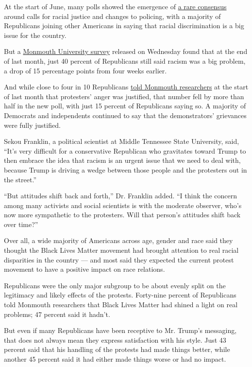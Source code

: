 At the start of June, many polls showed the emergence of
\href{https://www.nytimes.com/2020/06/05/us/politics/polling-george-floyd-protests-racism.html}{a
rare consensus} around calls for racial justice and changes to policing,
with a majority of Republicans joining other Americans in saying that
racial discrimination is a big issue for the country.

But a
\href{https://www.monmouth.edu/polling-institute/documents/monmouthpoll_us_070820.pdf/}{Monmouth
University survey} released on Wednesday found that at the end of last
month, just 40 percent of Republicans still said racism was a big
problem, a drop of 15 percentage points from four weeks earlier.

And while close to four in 10 Republicans
\href{https://www.monmouth.edu/polling-institute/documents/monmouthpoll_us_060220.pdf/}{told
Monmouth researchers} at the start of last month that protesters' anger
was justified, that number fell by more than half in the new poll, with
just 15 percent of Republicans saying so. A majority of Democrats and
independents continued to say that the demonstrators' grievances were
fully justified.

Sekou Franklin, a political scientist at Middle Tennessee State
University, said, ``It's very difficult for a conservative Republican
who gravitates toward Trump to then embrace the idea that racism is an
urgent issue that we need to deal with, because Trump is driving a wedge
between those people and the protesters out in the street.''

``But attitudes shift back and forth,'' Dr. Franklin added. ``I think
the concern among many activists and social scientists is with the
moderate observer, who's now more sympathetic to the protesters. Will
that person's attitudes shift back over time?''

Over all, a wide majority of Americans across age, gender and race said
they thought the Black Lives Matter movement had brought attention to
real racial disparities in the country --- and most said they expected
the current protest movement to have a positive impact on race
relations.

Republicans were the only major subgroup to be about evenly split on the
legitimacy and likely effects of the protests. Forty-nine percent of
Republicans told Monmouth researchers that Black Lives Matter had shined
a light on real problems; 47 percent said it hadn't.

But even if many Republicans have been receptive to Mr. Trump's
messaging, that does not always mean they express satisfaction with his
style. Just 43 percent said that his handling of the protests had made
things better, while another 45 percent said it had either made things
worse or had no impact.

